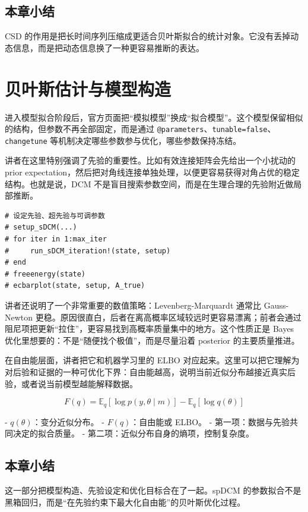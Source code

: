 \documentclass[a4paper]{article}
\begin{document}
\subsection{本章小结}
CSD 的作用是把长时间序列压缩成更适合贝叶斯拟合的统计对象。它没有丢掉动态信息，而是把动态信息换了一种更容易推断的表达。

\section{贝叶斯估计与模型构造}
进入模型拟合阶段后，官方页面把“模拟模型”换成“拟合模型”。这个模型保留相似的结构，但参数不再全部固定，而是通过 \texttt{@parameters}、\texttt{tunable=false}、\texttt{changetune} 等机制决定哪些参数参与优化，哪些参数保持冻结。

讲者在这里特别强调了先验的重要性。比如有效连接矩阵会先给出一个小扰动的 prior expectation，然后把对角线连接单独处理，以便更容易获得对角占优的稳定结构。也就是说，DCM 不是盲目搜索参数空间，而是在生理合理的先验附近做局部推断。

\begin{lstlisting}[caption={DCM 拟合阶段的关键接口}]
# 设定先验、超先验与可调参数
# setup_sDCM(...)
# for iter in 1:max_iter
#     run_sDCM_iteration!(state, setup)
# end
# freeenergy(state)
# ecbarplot(state, setup, A_true)
\end{lstlisting}

讲者还说明了一个非常重要的数值策略：Levenberg-Marquardt 通常比 Gauss-Newton 更稳。原因很直白，后者在离高概率区域较远时更容易漂离；前者会通过阻尼项把更新“拉住”，更容易找到高概率质量集中的地方。这个性质正是 Bayes 优化里想要的：不是“随便找个极值”，而是尽量沿着 posterior 的主要质量推进。

在自由能层面，讲者把它和机器学习里的 ELBO 对应起来。这里可以把它理解为对后验和证据的一种可优化下界：自由能越高，说明当前近似分布越接近真实后验，或者说当前模型越能解释数据。

\begin{equation*}
F(q) = \mathbb{E}_q[\log p(y,\theta\mid m)] - \mathbb{E}_q[\log q(\theta)]
\end{equation*}

- $q(\theta)$：变分近似分布。
- $F(q)$：自由能或 ELBO。
- 第一项：数据与先验共同决定的拟合质量。
- 第二项：近似分布自身的熵项，控制复杂度。

\subsection{本章小结}
这一部分把模型构造、先验设定和优化目标合在了一起。spDCM 的参数拟合不是黑箱回归，而是“在先验约束下最大化自由能”的贝叶斯优化过程。
\end{document}
